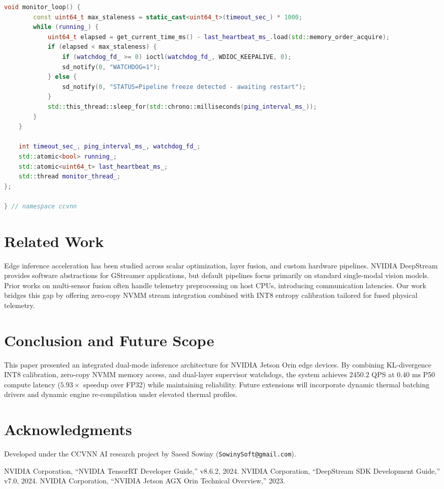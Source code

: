 \documentclass[10pt,journal,compsoc]{IEEEtran}
\begin{document}
\begin{lstlisting}[language=C++, caption={C++ Systemd and Linux Hardware Watchdog Integration.}, label={lst:watchdog}]
    void monitor_loop() {
        const uint64_t max_staleness = static_cast<uint64_t>(timeout_sec_) * 1000;
        while (running_) {
            uint64_t elapsed = get_current_time_ms() - last_heartbeat_ms_.load(std::memory_order_acquire);
            if (elapsed < max_staleness) {
                if (watchdog_fd_ >= 0) ioctl(watchdog_fd_, WDIOC_KEEPALIVE, 0);
                sd_notify(0, "WATCHDOG=1");
            } else {
                sd_notify(0, "STATUS=Pipeline freeze detected - awaiting restart");
            }
            std::this_thread::sleep_for(std::chrono::milliseconds(ping_interval_ms_));
        }
    }

    int timeout_sec_, ping_interval_ms_, watchdog_fd_;
    std::atomic<bool> running_;
    std::atomic<uint64_t> last_heartbeat_ms_;
    std::thread monitor_thread_;
};

} // namespace ccvnn
\end{lstlisting}

\section{Related Work}
Edge inference acceleration has been studied across scalar optimization, layer fusion, and custom hardware pipelines. NVIDIA DeepStream provides software abstractions for GStreamer applications, but default pipelines focus primarily on standard single-modal vision models. Prior works on multi-sensor fusion often handle telemetry preprocessing on host CPUs, introducing communication latencies. Our work bridges this gap by offering zero-copy NVMM stream integration combined with INT8 entropy calibration tailored for fused physical telemetry.

\section{Conclusion and Future Scope}
This paper presented an integrated dual-mode inference architecture for NVIDIA Jetson Orin edge devices. By combining KL-divergence INT8 calibration, zero-copy NVMM memory access, and dual-layer supervisor watchdogs, the system achieves $2450.2$ QPS at $0.40\text{~ms}$ P50 compute latency ($5.93\times$ speedup over FP32) while maintaining reliability. Future extensions will incorporate dynamic thermal batching drivers and dynamic engine re-compilation under elevated thermal profiles.

\section*{Acknowledgments}
Developed under the CCVNN AI research project by Saeed Sowiny (\texttt{SowinySoft@gmail.com}).

\begin{thebibliography}{99}
 NVIDIA Corporation, ``NVIDIA TensorRT Developer Guide,'' v8.6.2, 2024.
 NVIDIA Corporation, ``DeepStream SDK Development Guide,'' v7.0, 2024.
 NVIDIA Corporation, ``NVIDIA Jetson AGX Orin Technical Overview,'' 2023.
\end{thebibliography}
\end{document}
